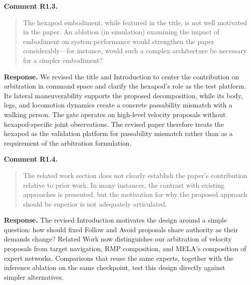 \documentclass[letterpaper,11pt]{article}
\begin{document}
\noindent\textbf{Comment R1.3.}
\begin{quote}\color{reviewgray}
The hexapod embodiment, while featured in the title, is not well motivated in the paper. An ablation (in simulation) examining the impact of embodiment on system performance would strengthen the paper considerably—for instance, would such a complex architecture be necessary for a simpler embodiment?
\end{quote}
\noindent\textbf{Response.}
We revised the title and Introduction to center the contribution on arbitration in command space and clarify the hexapod's role as the test platform. Its lateral maneuverability supports the proposed decomposition, while its body, legs, and locomotion dynamics create a concrete passability mismatch with a walking person. The gate operates on high-level velocity proposals without hexapod-specific joint observations. The revised paper therefore treats the hexapod as the validation platform for passability mismatch rather than as a requirement of the arbitration formulation.
\par\nopagebreak[4]


\noindent\textbf{Comment R1.4.}
\begin{quote}\color{reviewgray}
The related work section does not clearly establish the paper's contribution relative to prior work. In many instances, the contrast with existing approaches is presented, but the motivation for why the proposed approach should be superior is not adequately articulated.
\end{quote}
\noindent\textbf{Response.}
The revised Introduction motivates the design around a simple question: how should fixed Follow and Avoid proposals share authority as their demands change? Related Work now distinguishes our arbitration of velocity proposals from target navigation, RMP composition, and MELA's composition of expert networks. Comparisons that reuse the same experts, together with the inference ablation on the same checkpoint, test this design directly against simpler alternatives.
\par\nopagebreak[4]
\end{document}

